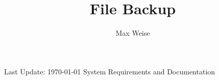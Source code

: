 \documentclass[12pt, a4paper, draft]{scrreprt}
\title{File Backup}
\author{Max Weise}
\begin{document}
\deckblatt
{\thetitle}
{\theauthor}
{}
{}
{Last Update: \today}
{System Requirements and Documentation}

\newpage

\tableofcontents










\end{document}
